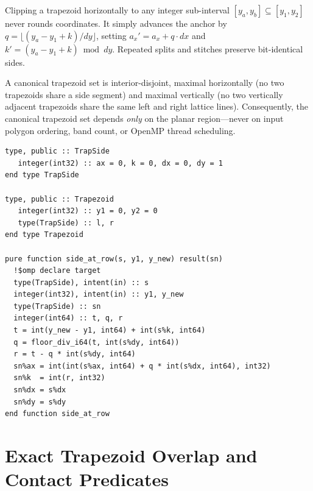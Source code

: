 \begin{invariant}
Clipping a trapezoid horizontally to any integer sub-interval $[y_a, y_b] \subseteq [y_1, y_2]$ never rounds coordinates. It simply advances the anchor by $q = \lfloor (y_a - y_1 + k)/dy \rfloor$, setting $a_x' = a_x + q \cdot dx$ and $k' = (y_a - y_1 + k) \bmod dy$. Repeated splits and stitches preserve bit-identical sides.
\end{invariant}

\begin{invariant}
A canonical trapezoid set is interior-disjoint, maximal horizontally (no two trapezoids share a side segment) and maximal vertically (no two vertically adjacent trapezoids share the same left and right lattice lines). Consequently, the canonical trapezoid set depends \emph{only} on the planar region---never on input polygon ordering, band count, or OpenMP thread scheduling.
\end{invariant}

\begin{lstlisting}[caption={Exact POD definitions and zero-drift vertical clipping in \texttt{src/trapezoid.f90}.},label={lst:trapezoid_def}]
type, public :: TrapSide
   integer(int32) :: ax = 0, k = 0, dx = 0, dy = 1
end type TrapSide

type, public :: Trapezoid
   integer(int32) :: y1 = 0, y2 = 0
   type(TrapSide) :: l, r
end type Trapezoid

pure function side_at_row(s, y1, y_new) result(sn)
  !$omp declare target
  type(TrapSide), intent(in) :: s
  integer(int32), intent(in) :: y1, y_new
  type(TrapSide) :: sn
  integer(int64) :: t, q, r
  t = int(y_new - y1, int64) + int(s%k, int64)
  q = floor_div_i64(t, int(s%dy, int64))
  r = t - q * int(s%dy, int64)
  sn%ax = int(int(s%ax, int64) + q * int(s%dx, int64), int32)
  sn%k  = int(r, int32)
  sn%dx = s%dx
  sn%dy = s%dy
end function side_at_row
\end{lstlisting}

\section{Exact Trapezoid Overlap and Contact Predicates}

